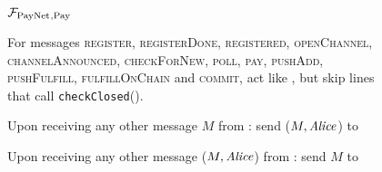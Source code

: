 \begin{figure}[H]
  \begin{systembox}{$\mathcal{F}_{\mathrm{PayNet}}{}_{\mathrm{, Pay}}$}
    \begin{algorithmic}[1]
      \State For messages \textsc{register}, \textsc{registerDone},
      \textsc{registered}, \textsc{openChannel}, \textsc{channelAnnounced},
      \textsc{checkForNew}, \textsc{poll}, \textsc{pay}, \textsc{pushAdd},
      \textsc{pushFulfill}, \textsc{fulfillOnChain} and \textsc{commit}, act
      like \fpaynet{}, but skip lines that call \texttt{checkClosed}().
      \Statex

      \State Upon receiving any other message $M$ from \alice:
      \Indent
          \State send ($M, \mathit{Alice}$) to \simulator
        \EndIf
      \EndIndent
      \Statex

      \State Upon receiving any other message ($M, \mathit{Alice}$) from \simulator:
      \Indent
          \State send $M$ to \alice
        \EndIf
      \EndIndent
    \end{algorithmic}
  \end{systembox}
  \caption{}
  \label{alg:proof:fpaynet:pay}
\end{figure}

